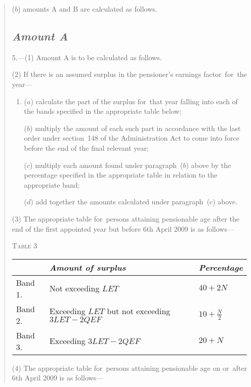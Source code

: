 \documentclass[12pt,a4paper]{article}
\begin{document}
\begin{quotation}
\begin{enumerate}
($b$) amounts A and B are calculated as follows.
\end{enumerate}

\subsection*{\itshape Amount A}

5.---(1) Amount A is to be calculated as follows.

(2) If there is an assumed surplus in the pensioner’s earnings factor~for~the year—
\begin{enumerate}\item[]
($a$) calculate the part of the surplus for~that year falling into each of the bands specified in the appropriate table below;

($b$) multiply the amount of each such part in accordance with the last order under section~148 of the Administration Act to come into force before the end of the final relevant year;

($c$) multiply each amount found under paragraph~($b$)  above by the percentage specified in the appropriate table in relation to the appropriate band;

($d$) add together the amounts calculated under paragraph~($c$)  above.
\end{enumerate}

(3) The appropriate table for~persons attaining pensionable age after the end of the first appointed year but before 6th April 2009 is as follows—

\pagebreak[3]

\noindent\textsc{Table 3}

{\noindent\footnotesize
\begin{longtable}{lll}
\hline
&\itshape Amount of surplus	&\itshape Percentage\\
\hline
\endhead
\hline
\endlastfoot
Band 1. 	&Not exceeding $LET$	&$40 + 2N$\\
Band 2. 	&Exceeding $LET$ but not exceeding $3LET - 2QEF$	&$10 + \frac{N}{2}$\\
Band 3. 	&Exceeding $3LET - 2QEF$	&$20 + N$\\
\end{longtable}

}

(4) The appropriate table for~persons attaining pensionable age on or~after 6th April 2009 is as follows—


\end{quotation}
\end{document}
